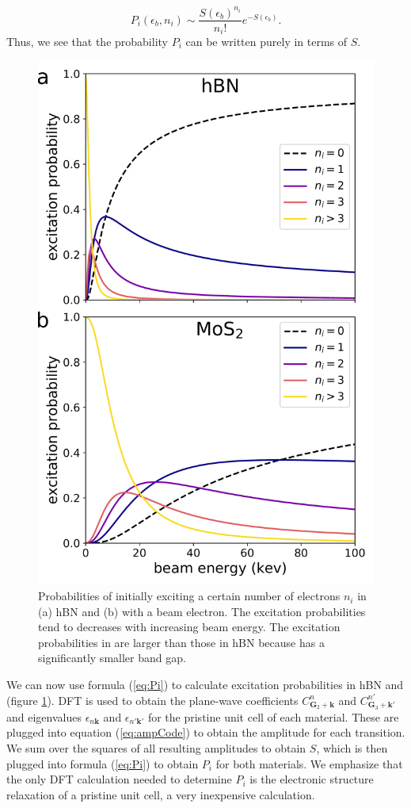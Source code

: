 \documentclass[twoside,twocolumn,9pt]{article}
\begin{document}
\begin{equation}
  P_i(\epsilon_b, n_i)
  \sim
  \frac{S(\epsilon_b)^{n_i}}{n_i!}
  e^{-S(\epsilon_b)}.
  \label{eq:Pi}
\end{equation}
%
Thus, we see that the probability $P_i$ can be written purely in terms of $S$.

\begin{figure}
  \centering
  \includegraphics[width=.45\textwidth]{figures/exciProbs_portrait.pdf}
  \caption{
    Probabilities of initially exciting a certain number of electrons $n_i$ in
    (a) hBN and (b)  with a beam electron.
    The excitation probabilities tend to decreases with increasing beam energy.
    The excitation probabilities in  are larger than those in hBN
    because  has a significantly smaller band gap.
  } 
  \label{fig:Pi}
\end{figure}

We can now use formula (\ref{eq:Pi}) to calculate excitation probabilities in
hBN and  (figure \ref{fig:Pi}).
DFT is used to obtain the plane-wave coefficients $C_{\mathbf{G}_2
+\mathbf{k}}^n$ and $C_{\mathbf{G}_3+\mathbf{k'}}^{n'}$ and eigenvalues
$\epsilon_{n\mathbf{k}}$ and $\epsilon_{n'\mathbf{k'}}$ for the pristine unit
cell of each material.
These are plugged into equation (\ref{eq:ampCode}) to obtain the amplitude for
each transition.
We sum over the squares of all resulting amplitudes to obtain $S$, which is
then plugged into formula (\ref{eq:Pi}) to obtain $P_i$ for both materials.
We emphasize that the only DFT calculation needed to determine $P_i$ is the
electronic structure relaxation of a pristine unit cell, a very inexpensive
calculation.
\end{document}
